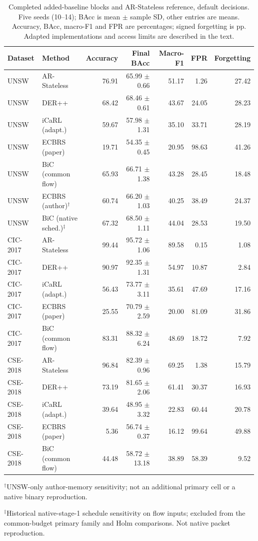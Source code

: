 \begin{table}[t]\centering\small
\caption{Completed added-baseline blocks and AR-Stateless reference, default decisions. Five seeds (10--14); BAcc is mean $\pm$ sample SD, other entries are means. Accuracy, BAcc, macro-F1 and FPR are percentages; signed forgetting is pp. Adapted implementations and access limits are described in the text.}
\label{tab:published-baselines-default}
\begin{tabular}{llrrrrr}\toprule
Dataset & Method & Accuracy & Final BAcc & Macro-F1 & FPR & Forgetting\\\midrule
UNSW & AR-Stateless & 76.91 & 65.99 $\pm$ 0.66 & 51.17 & 1.26 & 27.42\\
UNSW & DER++ & 68.42 & 68.46 $\pm$ 0.61 & 43.67 & 24.05 & 28.23\\
UNSW & iCaRL (adapt.) & 59.67 & 57.98 $\pm$ 1.31 & 35.10 & 33.71 & 28.19\\
UNSW & ECBRS (paper) & 19.71 & 54.35 $\pm$ 0.45 & 20.95 & 98.63 & 41.26\\
UNSW & BiC (common flow) & 65.93 & 66.71 $\pm$ 1.38 & 43.28 & 28.45 & 18.48\\
UNSW & ECBRS (author)$^\dagger$ & 60.74 & 66.20 $\pm$ 1.03 & 40.25 & 38.49 & 24.37\\
UNSW & BiC (native sched.)$^\ddagger$ & 67.32 & 68.50 $\pm$ 1.11 & 44.04 & 28.53 & 19.50\\
CIC-2017 & AR-Stateless & 99.44 & 95.72 $\pm$ 1.06 & 89.58 & 0.15 & 1.08\\
CIC-2017 & DER++ & 90.97 & 92.35 $\pm$ 1.31 & 54.97 & 10.87 & 2.84\\
CIC-2017 & iCaRL (adapt.) & 56.43 & 73.77 $\pm$ 3.11 & 35.61 & 47.69 & 17.16\\
CIC-2017 & ECBRS (paper) & 25.55 & 70.79 $\pm$ 2.59 & 20.00 & 81.09 & 31.86\\
CIC-2017 & BiC (common flow) & 83.31 & 88.32 $\pm$ 6.24 & 48.69 & 18.72 & 7.92\\
CSE-2018 & AR-Stateless & 96.84 & 82.39 $\pm$ 0.96 & 69.25 & 1.38 & 15.79\\
CSE-2018 & DER++ & 73.19 & 81.65 $\pm$ 2.06 & 61.41 & 30.37 & 16.93\\
CSE-2018 & iCaRL (adapt.) & 39.64 & 48.95 $\pm$ 3.32 & 22.83 & 60.44 & 20.78\\
CSE-2018 & ECBRS (paper) & 5.36 & 56.74 $\pm$ 0.37 & 16.12 & 99.64 & 49.88\\
CSE-2018 & BiC (common flow) & 44.48 & 58.72 $\pm$ 13.18 & 38.89 & 58.39 & 9.52\\
\bottomrule\end{tabular}
\par\smallskip\footnotesize $^\dagger$UNSW-only author-memory sensitivity; not an additional primary cell or a native binary reproduction.
\par\footnotesize $^\ddagger$Historical native-stage-1 schedule sensitivity on flow inputs; excluded from the common-budget primary family and Holm comparisons. Not native packet reproduction.
\end{table}
